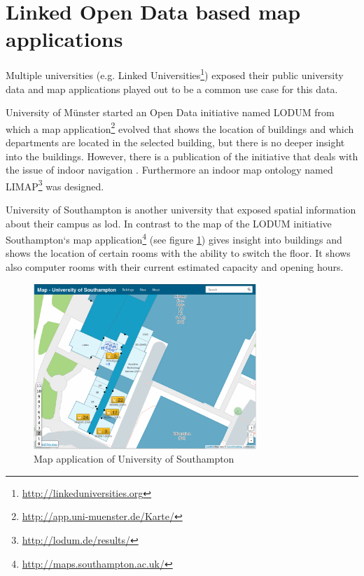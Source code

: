 \documentclass[draft,final]{vutinfth} %
\begin{document}
\section{Linked Open Data based map applications}
\label{related-work-map-app}

Multiple universities (e.g. Linked Universities\footnote{\url{http://linkeduniversities.org}}) exposed their public university data and map applications played out to be a common use case for this data.

University of Münster started an Open Data initiative named LODUM\cite{kesler_linked_2012} from which a map application\footnote{\url{http://app.uni-muenster.de/Karte/}} evolved that shows the location of buildings and which departments are located in the selected building, but there is no deeper insight into the buildings. However, there is a publication of the initiative that deals with the issue of indoor navigation \cite{kostic_automated_2015-1}. Furthermore an indoor map ontology named LIMAP\footnote{\url{http://lodum.de/results/}} was designed.

University of Southampton is another university that exposed spatial information about their campus as \gls{lod}. In contrast to the map of the LODUM initiative Southampton`s map application\footnote{\url{http://maps.southampton.ac.uk/}} (see figure \ref{fig:related-work-map-app:southampton}) gives insight into buildings and shows the location of certain rooms with the ability to switch the floor. It shows also computer rooms with their current estimated capacity and opening hours.  

\begin{figure}[h]
    \centering
    \includegraphics[width=0.75\textwidth]{graphics/maps/southampton-map-app.png}
    \caption{Map application of University of Southampton}
    \label{fig:related-work-map-app:southampton}
\end{figure}
\end{document}
